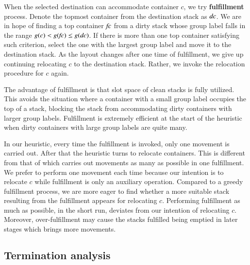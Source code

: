 \documentclass[review,3p,times,authoryear,12pt]{elsarticle}
\begin{document}
When the selected destination can accommodate container $c$, we try \textbf{fulfillment} process. Denote the topmost container from the destination stack as $\id{dc}$. We are in hope of finding a top container $\id{fc}$ from a dirty stack whose group label falls in the range $g(c)<g(\id{fc})\le g(\id{dc})$.
If there is more than one top container satisfying such criterion, select the one with the largest group label and move it to the destination stack. As the layout changes after one time of fulfillment, we give up continuing relocating $c$ to the destination stack. Rather, we invoke the relocation procedure for $c$ again.

The advantage of fulfillment is that slot space of clean stacks is fully utilized. This avoids the situation where a container with a small group label occupies the top of a stack, blocking the stack from accommodating dirty containers with larger group labels. Fulfillment is extremely efficient at the start of the heuristic when dirty containers with large group labels are quite many.

In our heuristic, every time the fulfillment is invoked, only one movement is carried out. After that the heuristic turns to relocate containers. This is different from that of \cite{Exposito2012} which carries out movements as many as possible in one fulfillment. We prefer to perform one movement each time because our intention is to relocate $c$ while fulfillment is only an auxiliary operation. Compared to a greedy fulfillment process, we are more eager to find whether a more suitable stack resulting from the fulfillment appears for relocating $c$. Performing fulfillment as much as possible, in the short run, deviates from our intention of relocating $c$. Moreover, over-fulfillment may cause the stacks fulfilled being emptied in later stages which brings more movements.

\subsection{Termination analysis}
\end{document}
